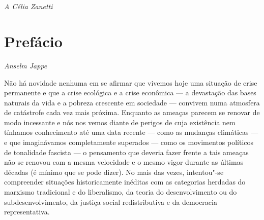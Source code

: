 

\chapter*{}

\vspace*{\fill}

\thispagestyle{empty}
\begin{flushright}
\emph{A Célia Zanetti}
\end{flushright}

\chapter*{Prefácio}


\begin{flushright}
\emph{Anselm Jappe}
\end{flushright}

Não há novidade nenhuma em se afirmar que vivemos hoje uma situação de
crise permanente e que a crise ecológica e a crise econômica --- a
devastação das bases naturais da vida e a pobreza crescente em sociedade
--- convivem numa atmosfera de catástrofe cada vez mais próxima. Enquanto
as ameaças parecem se renovar de modo incessante e nós nos vemos diante
de perigos de cuja existência nem tínhamos conhecimento até uma data
recente --- como as mudanças climáticas --- e que imaginávamos
completamente superados --- como os movimentos políticos de tonalidade
fascista --- o pensamento que deveria fazer frente a tais ameaças não se
renovou com a mesma velocidade e o mesmo vigor durante as últimas
décadas (é mínimo que se pode dizer). No mais das vezes, intentou"-se
compreender situações historicamente inéditas com as categorias herdadas
do marxismo tradicional e do liberalismo, da teoria do desenvolvimento
ou do subdesenvolvimento, da justiça social redistributiva e da
democracia representativa.

